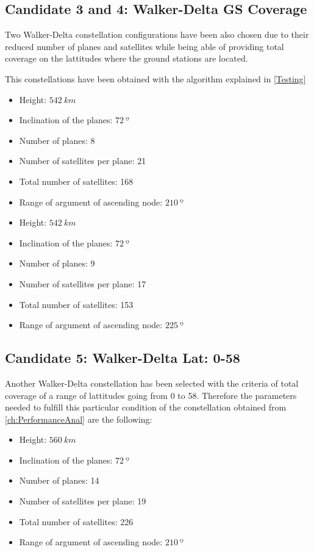 \subsection{Candidate 3 and 4: Walker-Delta GS Coverage}

Two Walker-Delta constellation configurations have been also chosen due to their reduced number of planes and satellites while being able of providing total coverage on the lattitudes where the ground stations are located.

This constellations have been obtained with the algorithm explained in \ref{Testing}

\begin{itemize}
\item Height: $542~{km}$ 
\item Inclination of the planes: $72~{º}$  
\item Number of planes: 8
\item Number of satellites per plane: 21
\item Total number of satellites: 168
\item Range of argument of ascending node: $210~{º}$ 
\end{itemize}

\begin{itemize}
\item Height: $542~{km}$ 
\item Inclination of the planes: $72~{º}$  
\item Number of planes: 9
\item Number of satellites per plane: 17
\item Total number of satellites: 153
\item Range of argument of ascending node: $225~{º}$
\end{itemize}

\subsection{Candidate 5: Walker-Delta Lat: 0-58}

Another Walker-Delta constellation has been selected with the criteria of total coverage of a range of lattitudes going from 0 to 58. Therefore the parameters needed to fulfill this particular condition of the constellation obtained from \ref{ch:PerformanceAnal} are the following:

\begin{itemize}
	\item Height: $560~{km}$ 
	\item Inclination of the planes: $72~{º}$  
	\item Number of planes: 14
	\item Number of satellites per plane: 19
	\item Total number of satellites: 226
	\item Range of argument of ascending node: $210~{º}$
\end{itemize}


